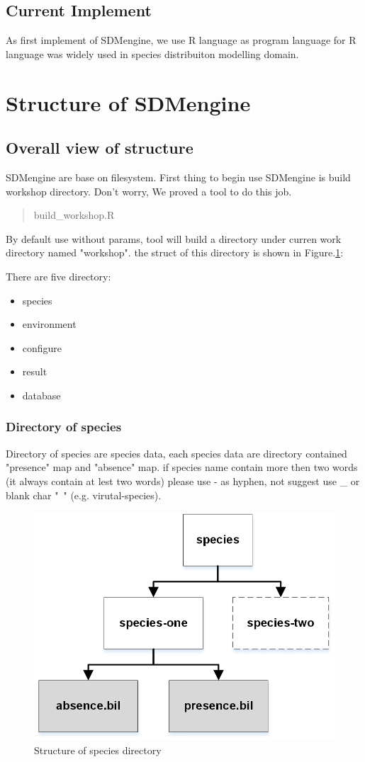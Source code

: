 \documentclass[10pt,a4paper]{report}
\begin{document}
\subsection{Current Implement}
As first implement of SDMengine, we use R language as program language for R language was widely used in species distribuiton modelling domain. 
\section{Structure of SDMengine}
\subsection{Overall view of structure}
SDMengine are base on filesystem. First thing to begin use SDMengine is build workshop directory. Don't worry, We proved a tool to do this job.
\begin{quote}
build\_workshop.R
\end{quote}
By default use without params, tool will build a directory under curren work directory named "workshop". the struct of this directory is shown in Figure.\ref{fig:workshop_structure}:



There are five directory:
\begin{itemize}
\item species
\item environment
\item configure
\item result
\item database
\end{itemize}

\subsubsection{Directory of species}
Directory of species are species data, each species data are directory contained "presence" map and "absence" map. if species name contain more then two words (it always contain at lest two words) please use - as hyphen, not suggest use \_ or blank char "\ " (e.g. virutal-species).

\begin{figure}[h]
\centering
\includegraphics[angle=0,width=0.55\linewidth]{species_directory.jpg}
\caption[workshop]{Structure of species directory}
\label{fig:workshop_structure}
\end{figure}
\end{document}
